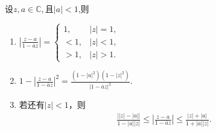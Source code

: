 \documentclass[../../main.tex]{subfiles}%
\begin{document}
\begin{proposition}
设$z,a\in \mathbb{C},$且$|a|<1$,则
\begin{enumerate}[(1)]
\item $\left| \frac{z-a}{1-\overline{a}z} \right|=
\begin{cases}
1,&|z|=1,\\
<1,&|z|<1,\\
>1,&|z|>1.
\end{cases}$

\item $1-\left| \frac{z-a}{1-\overline{a}z} \right|^2=\frac{\left( 1-\left| a \right|^2 \right) \left( 1-\left| z \right|^2 \right)}{\left| 1-\overline{a}z \right|^2}.$

\item 若还有$|z|<1$，则
\begin{align*}
\frac{\left| \left| z \right|-\left| a \right| \right|}{1-\left| a \right|\left| z \right|}\leqslant \left| \frac{z-a}{1-\overline{a}z} \right|\leqslant \frac{\left| z \right|+\left| a \right|}{1+\left| a \right|\left| z \right|}.
\end{align*}
\end{enumerate}
\end{proposition}
\end{document}
